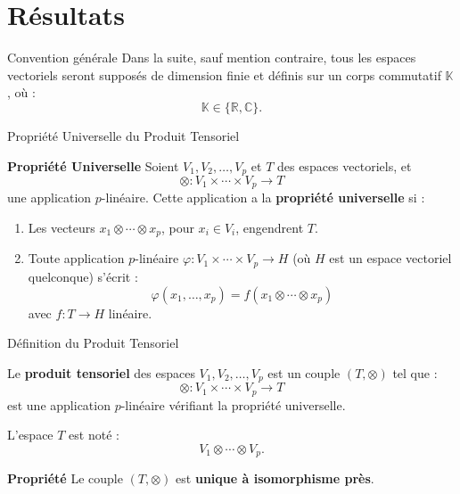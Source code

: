 \documentclass[9pt]{beamer}
\begin{document}
	\section{Résultats}
\begin{frame}{Convention générale}
Dans la suite, sauf mention contraire, tous les espaces vectoriels seront supposés de dimension finie et définis sur un corps commutatif \( \mathbb{K} \), où :
	\[
	\mathbb{K} \in \{ \mathbb{R}, \mathbb{C} \}.
	\]
\end{frame}

\begin{frame}{Propriété Universelle du Produit Tensoriel}
	\begin{block}{\textbf{Propriété Universelle}}
		Soient \( V_1, V_2, \ldots, V_p \) et \( T \) des espaces vectoriels, et
		\[
		\otimes : V_1 \times \cdots \times V_p \to T
		\]
		une application \( p \)-linéaire. Cette application a la \textbf{propriété universelle} si :
		\begin{enumerate}[label=\roman*)]
			\item Les vecteurs \( x_1 \otimes \cdots \otimes x_p \), pour \( x_i \in V_i \), engendrent \( T \).
			\item Toute application \( p \)-linéaire \( \varphi : V_1 \times \cdots \times V_p \to H \) (où \( H \) est un espace vectoriel quelconque) s’écrit :
			\[
			\varphi(x_1, \ldots, x_p) = f(x_1 \otimes \cdots \otimes x_p)
			\]
			avec \( f : T \to H \) linéaire.
		\end{enumerate}
	\end{block}
	
\end{frame}

\begin{frame}{Définition du Produit Tensoriel}
	\begin{definition}
		Le \textbf{produit tensoriel} des espaces \( V_1, V_2, \ldots, V_p \) est un couple \( (T, \otimes) \) tel que :
		\[
		\otimes : V_1 \times \cdots \times V_p \to T
		\]
		est une application \( p \)-linéaire vérifiant la propriété universelle.
		
		L’espace \( T \) est noté :
		\[
		V_1 \otimes \cdots \otimes V_p.
		\]
	\end{definition}
\begin{block}{\textbf{Propriété} \cite{greub2012linear}}
	Le couple \( (T, \otimes) \) est \textbf{unique à isomorphisme près}.
\end{block}

\end{frame}
\end{document}
